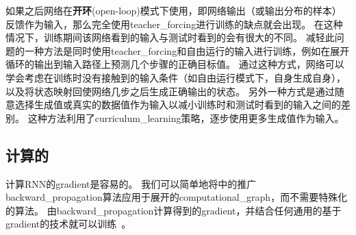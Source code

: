 
如果之后网络在\textbf{开环}(open-loop)模式下使用，即网络输出（或输出分布的样本）反馈作为输入，那么完全使用\gls{teacher_forcing}进行训练的缺点就会出现。
在这种情况下，训练期间该网络看到的输入与测试时看到的会有很大的不同。
减轻此问题的一种方法是同时使用\gls{teacher_forcing}和自由运行的输入进行训练，例如在展开循环的输出到输入路径上预测几个步骤的正确目标值。
通过这种方式，网络可以学会考虑在训练时没有接触到的输入条件（如自由运行模式下，自身生成自身），以及将状态映射回使网络几步之后生成正确输出的状态。
另外一种方式\citep{Bengio-et-al-2015b}是通过随意选择生成值或真实的数据值作为输入以减小训练时和测试时看到的输入之间的差别。
这种方法利用了\gls{curriculum_learning}策略，逐步使用更多生成值作为输入。

\subsection{计算的}
\label{sec:computing_the_gradient_in_a_recurrent_neural_network}
计算\gls{RNN}的\gls{gradient}是容易的。
我们可以简单地将中的推广\gls{backward_propagation}算法应用于展开的\gls{computational_graph}，而不需要特殊化的算法。
由\gls{backward_propagation}计算得到的\gls{gradient}，并结合任何通用的基于\gls{gradient}的技术就可以训练~。

